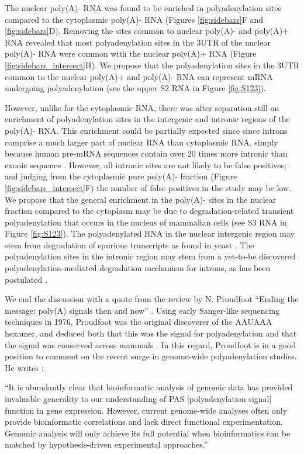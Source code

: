 The nuclear poly(A)- RNA was found to be enriched in polyadenylation sites
compared to the cytoplasmic poly(A)- RNA (Figures \ref{fig:sidebars}F and
\ref{fig:sidebars}D). Removing the sites common to nuclear poly(A)- and
poly(A)+ RNA revealed that most polyadenylation sites in the 3\ppp UTR of the
nuclear poly(A)- RNA were common with the nuclear poly(A)+ RNA (Figure
\ref{fig:sidebars_intersect}H). We propose that the polyadenylation sites in
the 3\ppp UTR common to the nuclear poly(A)+ and poly(A)- RNA can represent
mRNA undergoing polyadenylation (see the upper S2 RNA in Figure
\ref{fig:S123}).

However, unlike for the cytoplasmic RNA, there was after separation still an
enrichment of polyadenylation sites in the intergenic and intronic regions of
the poly(A)- RNA. This enrichment could be partially expected since since
introns comprise a much larger part of nuclear RNA than cytoplasmic RNA, simply
because human pre-mRNA sequences contain over 20 times more intronic than
exonic sequence \cite{venter_sequence_2001}. However, all intronic sites are
not likely to be false positives; and judging from the cytoplasmic pure
poly(A)- fraction (Figure \ref{fig:sidebars_intersect}F) the number of false
positives in the study may be low. We propose that the general enrichment in
the poly(A)- sites in the nuclear fraction compared to the cytoplasm may be due
to degradation-related transient polyadenylation that occurs in the nucleus of
mammalian cells \cite{lemay_nuclear_2010} (see S3 RNA in Figure \ref{fig:S123}).
The polyadenylated RNA in the nuclear intergenic region may stem from
degradation of spurious transcripts as found in yeast
\cite{wyers_cryptic_2005}. The polyadenylation sites in the intronic region may
stem from a yet-to-be discovered polyadenylation-mediated degradation mechanism
for introns, as has been postulated \cite{schmidt_polyadenylation_2010}.

We end the discussion with a quote from the review by N.
Proudfoot ``Ending the message: poly(A) signals then and now''
\cite{proudfoot_ending_2011}. Using early Sanger-like sequencing techniques in
1976, Proudfoot was the original discoverer of the AAUAAA hexamer, and deduced
both that this was the signal for polyadenylation and that the signal was
conserved across mammals \cite{proudfoot_3_1976}. In this regard, Proudfoot is
in a good position to comment on the recent surge in genome-wide
polyadenylation studies. He writes \cite{proudfoot_ending_2011}:

``It is abundantly clear that bioinformatic analysis of genomic data has
provided invaluable generality to our understanding of PAS [polyadenylation
signal] function in gene expression. However, current genome-wide analyses
often only provide bioinformatic correlations and lack direct functional
experimentation. Genomic analysis will only achieve its full potential when
bioinformatics can be matched by hypothesis-driven experimental approaches.''


